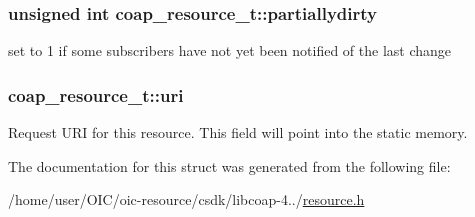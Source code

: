 \subsubsection[{partiallydirty}]{\setlength{\rightskip}{0pt plus 5cm}unsigned int coap\+\_\+resource\+\_\+t\+::partiallydirty}\label{structcoap__resource__t_a1574825943641eaf8fd4229bcbb818c8}
set to 1 if some subscribers have not yet been notified of the last change \hypertarget{structcoap__resource__t_aa250947f8ad4cf5e4ebe60ea305c4607}{}
\subsubsection[{uri}]{ coap\+\_\+resource\+\_\+t\+::uri}\label{structcoap__resource__t_aa250947f8ad4cf5e4ebe60ea305c4607}
Request U\+R\+I for this resource. This field will point into the static memory. 

The documentation for this struct was generated from the following file\+:\begin{DoxyCompactItemize}
\item 
/home/user/\+O\+I\+C/oic-\/resource/csdk/libcoap-\/4../\hyperlink{resource_8h}{resource.\+h}\end{DoxyCompactItemize}
